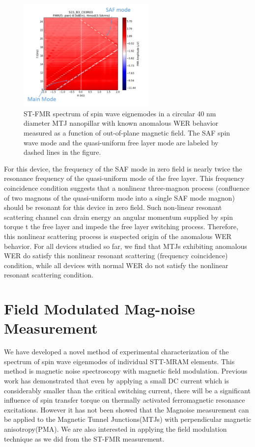 \begin{figure}[h!]
  \centering
  \includegraphics[width=0.6\textwidth]{fig/FieldMod/FMR-WER.png}
   \caption{ST-FMR spectrum of spin wave eignemodes in a circular 40 nm diameter MTJ nanopillar with known anomalous WER behavior measured as a function of out-of-plane magnetic field. The SAF spin wave mode and the quasi-uniform free layer mode are labeled by dashed lines in the figure.}
  \label{fig:WERSTFMR}
\end{figure}


For this device, the frequency of the SAF mode in zero field is nearly twice the resonance frequency of the quasi-uniform mode of the free layer. This frequency coincidence condition suggests that a nonlinear three-magnon process (confluence of two magnons of the quasi-uniform mode into a single SAF mode magnon) should be resonant for this device in zero field. Such non-linear resonant scattering channel can drain energy an angular momentum supplied by spin torque t the free layer and impede the free layer switching process. Therefore, this nonlinear scattering process is suspected origin of the anomalous WER behavior. For all devices studied so far, we find that MTJs exhibiting anomalous WER do satisfy this nonlinear resonant scattering (frequency coincidence) condition, while all devices with normal WER do not satisfy the nonlinear resonant scattering condition.




\section{Field Modulated Mag-noise Measurement}



We have developed a novel method of experimental characterization of the spectrum of spin wave eigenmodes of individual STT-MRAM elements. This method is magnetic noise spectroscopy with magnetic field modulation. Previous work\cite{MagnoisePRL}\cite{Magnoise} has demonstrated that even by applying a small DC current which is considerably smaller than the critical switching current, there will be a significant influence of spin transfer torque on thermally activated ferromagnetic resonance excitations. However it has not been showed that the Magnoise measurement can be applied to the Magnetic Tunnel Junctions(MTJs) with perpendicular magnetic anisotropy(PMA). We are also interested in applying the field modulation technique as we did from the ST-FMR measurement.


